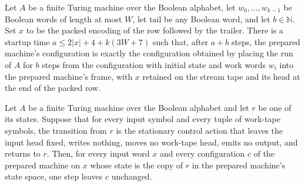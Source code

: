 \begin{lemma}
\label{Complexity.clPrepared_run}
\leanok
{}
Let $A$ be a finite Turing machine over the Boolean alphabet, let $w_0,\ldots,w_{k-1}$
be Boolean words of length at most $W$, let $\mathrm{tail}$ be any Boolean word, and let
$b\in\mathbb{N}$. Set $x$ to be the packed encoding of the row followed by the trailer.
There is a startup time $a\le 2|x|+4+k(3W+7)$ such that, after $a+b$ steps, the prepared
machine's configuration is exactly the configuration obtained by placing the run of $A$
for $b$ steps from the configuration with initial state and work words $w_i$ into the
prepared machine's frame, with $x$ retained on the stream tape and its head at the end
of the packed row.
\end{lemma}

\begin{lemma}
\label{Complexity.clPrepared_idle}
\leanok
{}
Let $A$ be a finite Turing machine over the Boolean alphabet and let $r$ be one of its
states. Suppose that for every input symbol and every tuple of work-tape symbols, the
transition from $r$ is the stationary control action that leaves the input head fixed,
writes nothing, moves no work-tape head, emits no output, and returns to $r$. Then, for
every input word $x$ and every configuration $c$ of the prepared machine on $x$ whose
state is the copy of $r$ in the prepared machine's state space, one step leaves $c$
unchanged.
\end{lemma}

